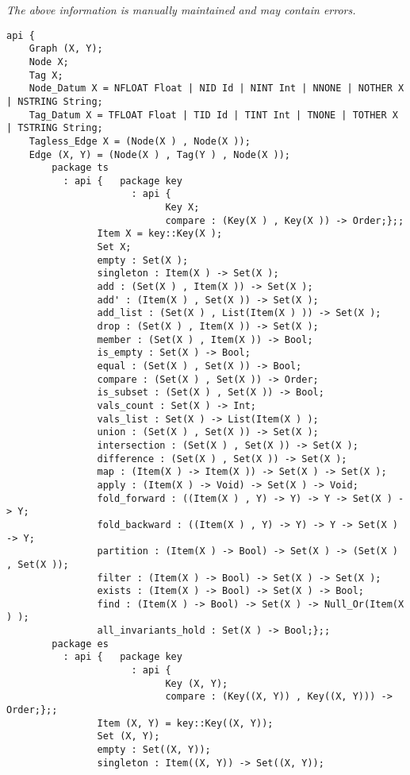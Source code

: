 \label{api:Digraphxy}

{\tiny \it The above information is manually maintained and may contain errors.}
\begin{verbatim}
api {
    Graph (X, Y);
    Node X;
    Tag X;
    Node_Datum X = NFLOAT Float | NID Id | NINT Int | NNONE | NOTHER X | NSTRING String;
    Tag_Datum X = TFLOAT Float | TID Id | TINT Int | TNONE | TOTHER X | TSTRING String;
    Tagless_Edge X = (Node(X ) , Node(X ));
    Edge (X, Y) = (Node(X ) , Tag(Y ) , Node(X ));
        package ts
          : api {   package key
                      : api {
                            Key X;
                            compare : (Key(X ) , Key(X )) -> Order;};;
                Item X = key::Key(X );
                Set X;
                empty : Set(X );
                singleton : Item(X ) -> Set(X );
                add : (Set(X ) , Item(X )) -> Set(X );
                add' : (Item(X ) , Set(X )) -> Set(X );
                add_list : (Set(X ) , List(Item(X ) )) -> Set(X );
                drop : (Set(X ) , Item(X )) -> Set(X );
                member : (Set(X ) , Item(X )) -> Bool;
                is_empty : Set(X ) -> Bool;
                equal : (Set(X ) , Set(X )) -> Bool;
                compare : (Set(X ) , Set(X )) -> Order;
                is_subset : (Set(X ) , Set(X )) -> Bool;
                vals_count : Set(X ) -> Int;
                vals_list : Set(X ) -> List(Item(X ) );
                union : (Set(X ) , Set(X )) -> Set(X );
                intersection : (Set(X ) , Set(X )) -> Set(X );
                difference : (Set(X ) , Set(X )) -> Set(X );
                map : (Item(X ) -> Item(X )) -> Set(X ) -> Set(X );
                apply : (Item(X ) -> Void) -> Set(X ) -> Void;
                fold_forward : ((Item(X ) , Y) -> Y) -> Y -> Set(X ) -> Y;
                fold_backward : ((Item(X ) , Y) -> Y) -> Y -> Set(X ) -> Y;
                partition : (Item(X ) -> Bool) -> Set(X ) -> (Set(X ) , Set(X ));
                filter : (Item(X ) -> Bool) -> Set(X ) -> Set(X );
                exists : (Item(X ) -> Bool) -> Set(X ) -> Bool;
                find : (Item(X ) -> Bool) -> Set(X ) -> Null_Or(Item(X ) );
                all_invariants_hold : Set(X ) -> Bool;};;
        package es
          : api {   package key
                      : api {
                            Key (X, Y);
                            compare : (Key((X, Y)) , Key((X, Y))) -> Order;};;
                Item (X, Y) = key::Key((X, Y));
                Set (X, Y);
                empty : Set((X, Y));
                singleton : Item((X, Y)) -> Set((X, Y));

\end{verbatim}
